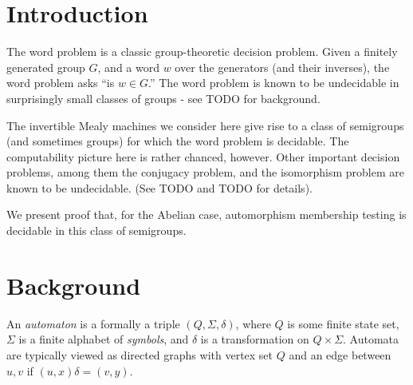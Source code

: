 \documentclass[10pt]{article}
\newcommand{\defn}[1]{\textit{#1}}
\begin{document}
\pagestyle{plain}
\title{\rmfamily\normalfont{}} \author{} \date{May 5, 2017}

\maketitle

\begin{abstract}
  We consider a variety of decision problems in groups and semigroups
  induced by invertible Mealy machines. Notably, we present proof that
  the automorphism membership problem in decidable in these
  semigroups. In addition, we prove undecidability of a Knapsack
  variant. A discussion of iteration and orbit rationality follows.
\end{abstract}

\tableofcontents

\section{Introduction}
The word problem is a classic group-theoretic decision problem. Given
a finitely generated group $G$, and a word $w$ over the generators
(and their inverses), the word problem asks ``is $w \in G$.'' The word
problem is known to be undecidable in surprisingly small classes of
groups - see TODO for background.

The invertible Mealy machines we consider here give rise to a class of
semigroups (and sometimes groups) for which the word problem is
decidable. The computability picture here is rather chanced,
however. Other important decision problems, among them the conjugacy
problem, and the isomorphism problem are known to be undecidable. (See
TODO and TODO for details).

We present proof that, for the Abelian case, automorphism membership
testing is decidable in this class of semigroups.

\section{Background}
An \defn{automaton} is a formally a triple $(Q, \Sigma, \delta)$,
where $Q$ is some finite state set, $\Sigma$ is a finite alphabet of
\defn{symbols}, and $\delta$ is a transformation on $Q \times \Sigma$.
Automata are typically viewed as directed graphs with vertex set $Q$
and an edge between $u, v$ if $(u, x)\delta = (v, y)$.
\end{document}
